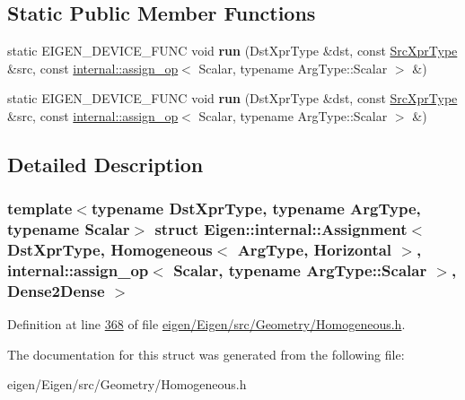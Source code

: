 \subsection*{Static Public Member Functions}
\begin{DoxyCompactItemize}
\item 
\mbox{\label{struct_eigen_1_1internal_1_1_assignment_3_01_dst_xpr_type_00_01_homogeneous_3_01_arg_type_00_01_bd4940a657c6f656a2015456f5ba4803_af499e5c05f833725f99b695b9d3cbae5}} 
static E\+I\+G\+E\+N\+\_\+\+D\+E\+V\+I\+C\+E\+\_\+\+F\+U\+NC void {\bfseries run} (Dst\+Xpr\+Type \&dst, const \hyperlink{group___geometry___module_class_eigen_1_1_homogeneous}{Src\+Xpr\+Type} \&src, const \hyperlink{struct_eigen_1_1internal_1_1assign__op}{internal\+::assign\+\_\+op}$<$ Scalar, typename Arg\+Type\+::\+Scalar $>$ \&)
\item 
\mbox{\label{struct_eigen_1_1internal_1_1_assignment_3_01_dst_xpr_type_00_01_homogeneous_3_01_arg_type_00_01_bd4940a657c6f656a2015456f5ba4803_af499e5c05f833725f99b695b9d3cbae5}} 
static E\+I\+G\+E\+N\+\_\+\+D\+E\+V\+I\+C\+E\+\_\+\+F\+U\+NC void {\bfseries run} (Dst\+Xpr\+Type \&dst, const \hyperlink{group___geometry___module_class_eigen_1_1_homogeneous}{Src\+Xpr\+Type} \&src, const \hyperlink{struct_eigen_1_1internal_1_1assign__op}{internal\+::assign\+\_\+op}$<$ Scalar, typename Arg\+Type\+::\+Scalar $>$ \&)
\end{DoxyCompactItemize}


\subsection{Detailed Description}
\subsubsection*{template$<$typename Dst\+Xpr\+Type, typename Arg\+Type, typename Scalar$>$\newline
struct Eigen\+::internal\+::\+Assignment$<$ Dst\+Xpr\+Type, Homogeneous$<$ Arg\+Type, Horizontal $>$, internal\+::assign\+\_\+op$<$ Scalar, typename Arg\+Type\+::\+Scalar $>$, Dense2\+Dense $>$}



Definition at line \hyperlink{eigen_2_eigen_2src_2_geometry_2_homogeneous_8h_source_l00368}{368} of file \hyperlink{eigen_2_eigen_2src_2_geometry_2_homogeneous_8h_source}{eigen/\+Eigen/src/\+Geometry/\+Homogeneous.\+h}.



The documentation for this struct was generated from the following file\+:\begin{DoxyCompactItemize}
\item 
eigen/\+Eigen/src/\+Geometry/\+Homogeneous.\+h\end{DoxyCompactItemize}
